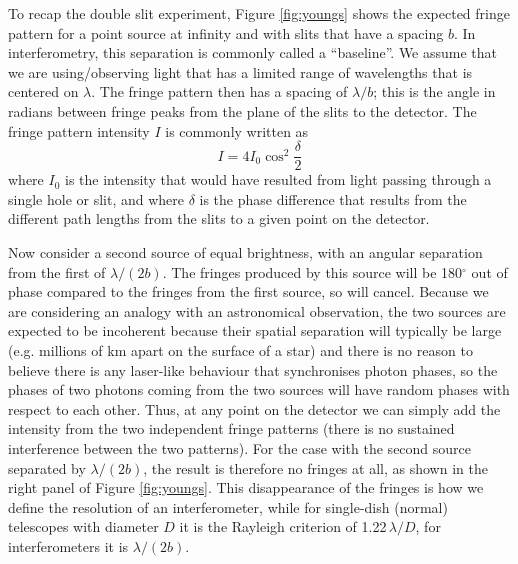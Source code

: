 \documentclass[11pt]{article}
\begin{document}
To recap the double slit experiment, Figure \ref{fig:youngs} shows the expected fringe pattern for a point source at infinity and with slits that have a spacing $b$. In interferometry, this separation is commonly called a ``baseline''. We assume that we are using/observing light that has a limited range of wavelengths that is centered on $\lambda$. The fringe pattern then has a spacing of $\lambda/b$; this is the angle in radians between fringe peaks from the plane of the slits to the detector. The fringe pattern intensity $I$ is commonly written as
\begin{equation}\label{eq:fringepattern}
    I = 4 I_0 \cos^2 \frac{\delta}{2}
\end{equation}
where $I_0$ is the intensity that would have resulted from light passing through a single hole or slit, and where $\delta$ is the phase difference that results from the different path lengths from the slits to a given point on the detector.

Now consider a second source of equal brightness, with an angular separation from the first of $\lambda/(2b)$. The fringes produced by this source will be 180$^\circ$ out of phase compared to the fringes from the first source, so will cancel. Because we are considering an analogy with an astronomical observation, the two sources are expected to be incoherent because their spatial separation will typically be large (e.g. millions of km apart on the surface of a star) and there is no reason to believe there is any laser-like behaviour that synchronises photon phases, so the phases of two photons coming from the two sources will have random phases with respect to each other. Thus, at any point on the detector we can simply add the intensity from the two independent fringe patterns (there is no sustained interference between the two patterns). For the case with the second source separated by $\lambda/(2b)$, the result is therefore no fringes at all, as shown in the right panel of Figure \ref{fig:youngs}. This disappearance of the fringes is how we define the resolution of an interferometer, while for single-dish (normal) telescopes with diameter $D$ it is the Rayleigh criterion of 1.22\,$\lambda/D$, for interferometers it is $\lambda/(2b)$.
\end{document}
